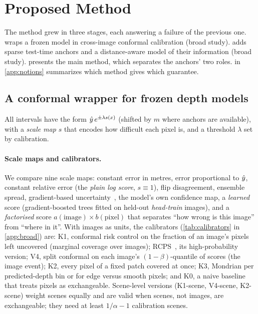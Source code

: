 \section{Proposed Method}
\label{sec:method}

The method grew in three stages, each answering a failure of the previous one.
 wraps a frozen model in cross-image conformal calibration (broad study).
 adds sparse test-time anchors and a distance-aware model of their information (broad study).
 presents the main method, which separates the anchors' two roles.
 in \cref{app:notions} summarizes which method gives which guarantee.

\subsection{A conformal wrapper for frozen depth models}
\label{sec:method:wrapper}
All intervals have the form $\hat{y}\,e^{\pm\lambda s(x)}$ (shifted by $m$ where anchors are available), with a \emph{scale map} $s$ that encodes how difficult each pixel is, and a threshold $\lambda$ set by calibration.

\paragraph{Scale maps and calibrators.}
We compare nine scale maps: constant error in metres, error proportional to $\hat{y}$, constant relative error (the \emph{plain log score}, $s\equiv1$), flip disagreement, ensemble spread, gradient-based uncertainty~\cite{hornauer2022gradient}, the model's own confidence map, a \emph{learned} score (gradient-boosted trees fitted on held-out \emph{head-train} images), and a \emph{factorised} score $a(\text{image})\times b(\text{pixel})$ that separates ``how wrong is this image'' from ``where in it''.
With images as units, the calibrators (\cref{tab:calibrators} in \cref{app:broad}) are: K1, conformal risk control on the fraction of an image's pixels left uncovered (marginal coverage over images); RCPS~\cite{bates2021rcps}, its high-probability version; V4, split conformal on each image's $(1-\beta)$-quantile of scores (the image event); K2, every pixel of a fixed patch covered at once; K3, Mondrian per predicted-depth bin or for edge versus smooth pixels; and K0, a naive baseline that treats pixels as exchangeable.
Scene-level versions (K1-scene, V4-scene, K2-scene) weight scenes equally and are valid when scenes, not images, are exchangeable; they need at least $1/\alpha-1$ calibration scenes.

